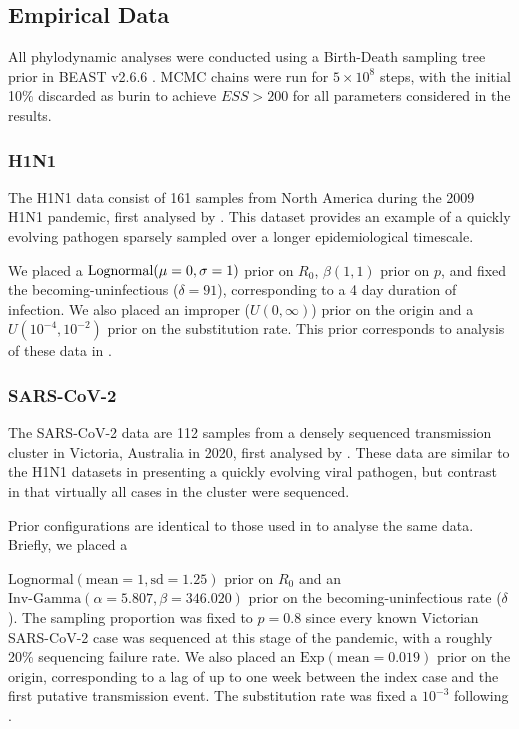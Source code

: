 \documentclass{article}
\begin{document}
\begin{spacing}{1.5}
\subsection*{Empirical Data}
All phylodynamic analyses were conducted using a Birth-Death sampling tree prior in BEAST v2.6.6 \citep{bouckaert_beast_2019}. MCMC chains were run for $5\times10^{8}$ steps, with the initial 10\% discarded as burin to achieve $ESS > 200$ for all parameters considered in the results.

\subsubsection*{H1N1}
The H1N1 data consist of 161 samples from North America during the 2009 H1N1 pandemic, first analysed by \citet{hedge_2013_real-time}. This  dataset provides an example of a quickly evolving pathogen sparsely sampled over a longer epidemiological timescale. 

We placed a $\textnormal{Lognormal}(\mu=0,\sigma=1)$ prior on $R_0$, $\beta(1,1)$ prior on $p$, and fixed the becoming-uninfectious ($\delta = 91$), corresponding to a 4 day duration of infection. We also placed an improper ($U(0,\infty)$) prior on the origin and a $U(10^{-4},10^{-2})$ prior on the substitution rate. This prior corresponds to analysis of these data in \citet{featherstone_decoding_2023}.

\subsubsection*{SARS-CoV-2}
The SARS-CoV-2 data are 112 samples from a densely sequenced transmission cluster in Victoria, Australia in 2020, first analysed by \citet{lane2021genomics}. These data are similar to the H1N1 datasets in presenting a quickly evolving viral pathogen, but contrast in that virtually all cases in the cluster were sequenced. 

Prior configurations are identical to those used in \citet{featherstone_decoding_2023} to analyse the same data. Briefly, we placed a 

$\textrm{Lognormal}(\textrm{mean}=1, \textrm{sd}=1.25)$ prior on $R_0$ and an $\textrm{Inv-Gamma}(\alpha=5.807, \beta=346.020)$ prior on the becoming-uninfectious rate ($\delta$).  The sampling proportion was fixed to $p=0.8$ since every known Victorian SARS-CoV-2 case was sequenced at this stage of the pandemic, with a roughly 20\% sequencing failure rate. We also placed an $\textrm{Exp}(\textrm{mean}=0.019)$ prior on the origin, corresponding to a lag of up to one week  between the index case and the first putative transmission event. The substitution rate was fixed a $10^{-3}$ following \citep{duchene_temporal_2020}.


\end{spacing}
\end{document}
